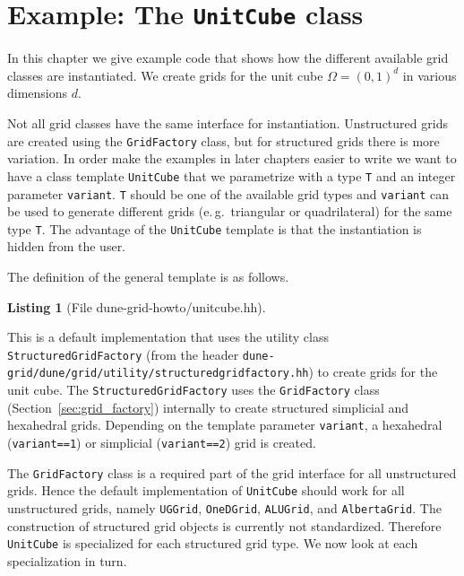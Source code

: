 \documentclass[11pt,a4paper,headinclude,footinclude,DIV16,headings=normal]{scrreprt}
\newtheorem{lst}{Listing}
\begin{document}
\section{Example: The \texorpdfstring{\lstinline{UnitCube}}{UnitCube} class}

In this chapter we give example code that shows how the different available grid
classes are instantiated. We create grids for the unit
cube $\Omega=(0,1)^d$ in various dimensions $d$.

Not all grid classes have the same interface for instantiation.
Unstructured grids are created using the \lstinline!GridFactory! class,
but for structured grids there is more variation.  In order make the
examples in later chapters easier to write we want to have a class template
\lstinline!UnitCube! that we parametrize with a type \lstinline!T! and
an integer parameter \lstinline!variant!. \lstinline!T! should be
one of the available grid types and \lstinline!variant! can be used to
generate different grids (e.\,g.~triangular or quadrilateral) for the
same type \lstinline!T!. The advantage of the \lstinline!UnitCube!
template is that the instantiation is hidden from the user.

The definition of the general template is as follows.

\begin{lst}[File dune-grid-howto/unitcube.hh] \mbox{}
\nopagebreak

\end{lst}

This is a default implementation that uses the utility class
\lstinline!StructuredGridFactory! (from the header \lstinline!dune-grid/dune/grid/utility/structuredgridfactory.hh!)
to create grids for the unit cube.  The \lstinline!StructuredGridFactory!
uses the \lstinline!GridFactory! class (Section~\ref{sec:grid_factory})
internally to create structured simplicial and hexahedral grids.
Depending on the template parameter \lstinline!variant!, a
hexahedral (\lstinline!variant==1!) or simplicial (\lstinline!variant==2!)
grid is created.

The \lstinline!GridFactory! class is a required part of the grid interface
for all unstructured grids.  Hence the default implementation of \lstinline!UnitCube!
should work for all unstructured grids, namely \lstinline!UGGrid!,
\lstinline!OneDGrid!, \lstinline!ALUGrid!, and \lstinline!AlbertaGrid!.
The construction of structured grid objects is currently not standardized.
Therefore \lstinline!UnitCube! is specialized for each structured grid
type.  We now look at each specialization in turn.
\end{document}
